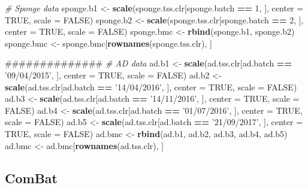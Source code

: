 \documentclass[]{book}
\newenvironment{Shaded}{\begin{snugshade}}{\end{snugshade}}
\newcommand{\KeywordTok}[1]{\textcolor[rgb]{0.13,0.29,0.53}{\textbf{#1}}}
\newcommand{\DataTypeTok}[1]{\textcolor[rgb]{0.13,0.29,0.53}{#1}}
\newcommand{\DecValTok}[1]{\textcolor[rgb]{0.00,0.00,0.81}{#1}}
\newcommand{\StringTok}[1]{\textcolor[rgb]{0.31,0.60,0.02}{#1}}
\newcommand{\CommentTok}[1]{\textcolor[rgb]{0.56,0.35,0.01}{\textit{#1}}}
\newcommand{\OtherTok}[1]{\textcolor[rgb]{0.56,0.35,0.01}{#1}}
\newcommand{\OperatorTok}[1]{\textcolor[rgb]{0.81,0.36,0.00}{\textbf{#1}}}
\newcommand{\NormalTok}[1]{#1}
\begin{document}
\begin{Shaded}
\begin{Highlighting}[]
\CommentTok{# Sponge data}
\NormalTok{sponge.b1 <-}\StringTok{ }\KeywordTok{scale}\NormalTok{(sponge.tss.clr[sponge.batch }\OperatorTok{==}\StringTok{ }\DecValTok{1}\NormalTok{, ], }\DataTypeTok{center =} \OtherTok{TRUE}\NormalTok{, }\DataTypeTok{scale =} \OtherTok{FALSE}\NormalTok{)}
\NormalTok{sponge.b2 <-}\StringTok{ }\KeywordTok{scale}\NormalTok{(sponge.tss.clr[sponge.batch }\OperatorTok{==}\StringTok{ }\DecValTok{2}\NormalTok{, ], }\DataTypeTok{center =} \OtherTok{TRUE}\NormalTok{, }\DataTypeTok{scale =} \OtherTok{FALSE}\NormalTok{)}
\NormalTok{sponge.bmc <-}\StringTok{ }\KeywordTok{rbind}\NormalTok{(sponge.b1, sponge.b2)}
\NormalTok{sponge.bmc <-}\StringTok{ }\NormalTok{sponge.bmc[}\KeywordTok{rownames}\NormalTok{(sponge.tss.clr), ]}

\NormalTok{##############}
\CommentTok{# AD data}
\NormalTok{ad.b1 <-}\StringTok{ }\KeywordTok{scale}\NormalTok{(ad.tss.clr[ad.batch }\OperatorTok{==}\StringTok{ '09/04/2015'}\NormalTok{, ], }\DataTypeTok{center =} \OtherTok{TRUE}\NormalTok{, }\DataTypeTok{scale =} \OtherTok{FALSE}\NormalTok{)}
\NormalTok{ad.b2 <-}\StringTok{ }\KeywordTok{scale}\NormalTok{(ad.tss.clr[ad.batch }\OperatorTok{==}\StringTok{ '14/04/2016'}\NormalTok{, ], }\DataTypeTok{center =} \OtherTok{TRUE}\NormalTok{, }\DataTypeTok{scale =} \OtherTok{FALSE}\NormalTok{)}
\NormalTok{ad.b3 <-}\StringTok{ }\KeywordTok{scale}\NormalTok{(ad.tss.clr[ad.batch }\OperatorTok{==}\StringTok{ '14/11/2016'}\NormalTok{, ], }\DataTypeTok{center =} \OtherTok{TRUE}\NormalTok{, }\DataTypeTok{scale =} \OtherTok{FALSE}\NormalTok{)}
\NormalTok{ad.b4 <-}\StringTok{ }\KeywordTok{scale}\NormalTok{(ad.tss.clr[ad.batch }\OperatorTok{==}\StringTok{ '01/07/2016'}\NormalTok{, ], }\DataTypeTok{center =} \OtherTok{TRUE}\NormalTok{, }\DataTypeTok{scale =} \OtherTok{FALSE}\NormalTok{)}
\NormalTok{ad.b5 <-}\StringTok{ }\KeywordTok{scale}\NormalTok{(ad.tss.clr[ad.batch }\OperatorTok{==}\StringTok{ '21/09/2017'}\NormalTok{, ], }\DataTypeTok{center =} \OtherTok{TRUE}\NormalTok{, }\DataTypeTok{scale =} \OtherTok{FALSE}\NormalTok{)}
\NormalTok{ad.bmc <-}\StringTok{ }\KeywordTok{rbind}\NormalTok{(ad.b1, ad.b2, ad.b3, ad.b4, ad.b5)}
\NormalTok{ad.bmc <-}\StringTok{ }\NormalTok{ad.bmc[}\KeywordTok{rownames}\NormalTok{(ad.tss.clr), ]}
\end{Highlighting}
\end{Shaded}

\subsection{ComBat}\label{combat}
\end{document}
